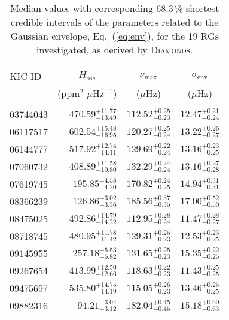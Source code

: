 \documentclass[structabstract]{aa}
\newcommand{\numax}{\nu_\mathrm{max}}
\newcommand{\muhz}{$\mu$Hz}
\newcommand{\diamonds}{\textsc{D\large{iamonds}}}
\begin{document}
\begin{table*}
\caption{Median values with corresponding 68.3\,\% shortest credible intervals of the parameters related to the Gaussian envelope, Eq.~(\ref{eq:env}), for the 19 RGs investigated, as derived by \diamonds.}             %
\centering                         
\begin{tabular}{l r c c}       
\hline\hline
\\[-8pt]         
KIC ID & \multicolumn{1}{c}{$H_\mathrm{osc}$} & $\numax$ & $\sigma_\mathrm{env}$\\ [1pt]
 & \multicolumn{1}{c}{(ppm$^2$ $\mu$Hz$^{-1}$)} & (\muhz)  & (\muhz) \\ [1pt]   
\hline
\\[-8pt]
03744043         & $470.59_{-13.49}^{+11.77}$   &   $112.52_{-0.23}^{+0.25}$   &   $12.47_{-0.24}^{+0.21}$ \\[1pt]
06117517         & $602.54_{-16.95}^{+15.48}$   &   $120.27_{-0.24}^{+0.25}$   &   $13.22_{-0.27}^{+0.26}$ \\[1pt]
06144777         & $517.92_{-14.11}^{+12.74}$   &   $129.69_{-0.24}^{+0.22}$   &   $13.16_{-0.25}^{+0.23}$ \\[1pt]
07060732         & $408.89_{-10.80}^{+11.58}$   &   $132.29_{-0.24}^{+0.24}$   &   $13.16_{-0.28}^{+0.27}$ \\[1pt]
07619745         & $195.85_{-4.20}^{+4.58}$   &   $170.82_{-0.25}^{+0.24}$   &   $14.94_{-0.31}^{+0.31}$ \\[1pt]
08366239         & $126.86_{-3.36}^{+3.02}$   &   $185.56_{-0.35}^{+0.37}$   &   $17.00_{-0.50}^{+0.52}$ \\[1pt]
08475025         & $492.86_{-14.22}^{+14.79}$   &   $112.95_{-0.24}^{+0.28}$   &   $11.47_{-0.27}^{+0.28}$ \\[1pt]
08718745         & $480.95_{-11.42}^{+11.78}$   &   $129.31_{-0.23}^{+0.25}$   &   $12.53_{-0.25}^{+0.23}$ \\[1pt]
09145955         & $257.18_{-5.82}^{+5.53}$   &   $131.65_{-0.23}^{+0.25}$   &   $15.35_{-0.25}^{+0.22}$ \\[1pt]
09267654         & $413.99_{-12.66}^{+12.50}$   &   $118.63_{-0.23}^{+0.22}$   &   $11.43_{-0.25}^{+0.25}$ \\[1pt]
09475697         & $535.80_{-14.19}^{+14.75}$   &   $115.05_{-0.23}^{+0.26}$   &   $13.46_{-0.25}^{+0.25}$ \\[1pt]
09882316         & $94.21_{-3.12}^{+3.04}$   &   $182.04_{-0.45}^{+0.45}$   &   $15.18_{-0.63}^{+0.60}$ \\[1pt]

\end{tabular}
\end{table*}
\end{document}
